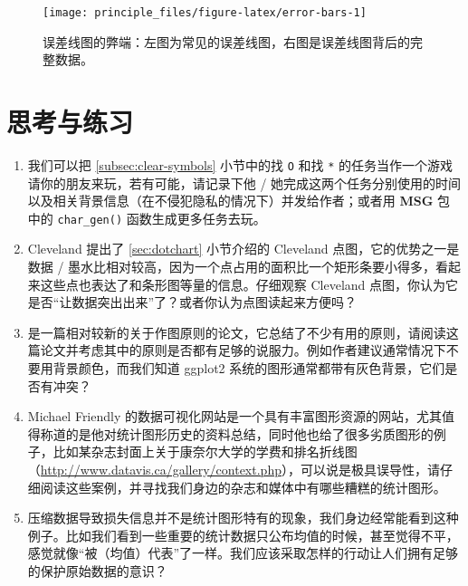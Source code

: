 \documentclass[
  b5paper,
  UTF8,twoside]{book}
\begin{document}
\begin{figure}

{\centering \texttt{[image: principle\_files/figure-latex/error-bars-1]} 

}

\caption[ 误差线图的弊端 ]{误差线图的弊端：左图为常见的误差线图，右图是误差线图背后的完整数据。}\label{fig:error-bars}
\end{figure}



\hypertarget{ux601dux8003ux4e0eux7ec3ux4e60-6}{%
\section{思考与练习}\label{ux601dux8003ux4e0eux7ec3ux4e60-6}}

\begin{enumerate}
\def\labelenumi{\arabic{enumi}.}
\item
  我们可以把 \ref{subsec:clear-symbols} 小节中的找 \texttt{O} 和找 \texttt{*} 的任务当作一个游戏请你的朋友来玩，若有可能，请记录下他 / 她完成这两个任务分别使用的时间以及相关背景信息（在不侵犯隐私的情况下）并发给作者；或者用 \textbf{MSG} 包中的 \texttt{char\_gen()} 函数生成更多任务去玩。
\item
  Cleveland 提出了 \ref{sec:dotchart} 小节介绍的 Cleveland 点图，它的优势之一是数据 / 墨水比相对较高，因为一个点占用的面积比一个矩形条要小得多，看起来这些点也表达了和条形图等量的信息。仔细观察 Cleveland 点图，你认为它是否``让数据突出出来''了？或者你认为点图读起来方便吗？
\item
  \citet{Lane09} 是一篇相对较新的关于作图原则的论文，它总结了不少有用的原则，请阅读这篇论文并考虑其中的原则是否都有足够的说服力。例如作者建议通常情况下不要用背景颜色，而我们知道 ggplot2 系统的图形通常都带有灰色背景，它们是否有冲突？
\item
  Michael Friendly 的数据可视化网站是一个具有丰富图形资源的网站，尤其值得称道的是他对统计图形历史的资料总结，同时他也给了很多劣质图形的例子，比如某杂志封面上关于康奈尔大学的学费和排名折线图（\url{http://www.datavis.ca/gallery/context.php}），可以说是极具误导性，请仔细阅读这些案例，并寻找我们身边的杂志和媒体中有哪些糟糕的统计图形。
\item
  压缩数据导致损失信息并不是统计图形特有的现象，我们身边经常能看到这种例子。比如我们看到一些重要的统计数据只公布均值的时候，甚至觉得不平，感觉就像``被（均值）代表''了一样。我们应该采取怎样的行动让人们拥有足够的保护原始数据的意识？
\end{enumerate}

\cleardoublepage
\end{document}
